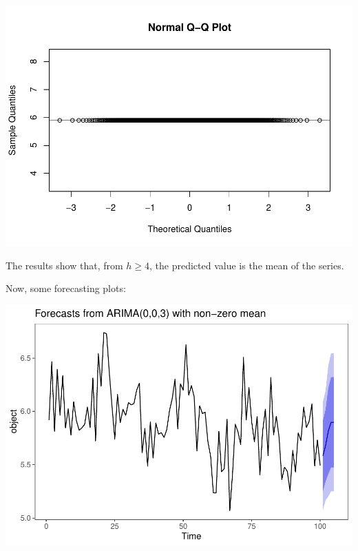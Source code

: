 \documentclass[]{article}
\newenvironment{Shaded}{\begin{snugshade}}{\end{snugshade}}
\newcommand{\DataTypeTok}[1]{\textcolor[rgb]{0.13,0.29,0.53}{#1}}
\newcommand{\KeywordTok}[1]{\textcolor[rgb]{0.13,0.29,0.53}{\textbf{#1}}}
\newcommand{\NormalTok}[1]{#1}
\newcommand{\OperatorTok}[1]{\textcolor[rgb]{0.81,0.36,0.00}{\textbf{#1}}}
\newcommand{\StringTok}[1]{\textcolor[rgb]{0.31,0.60,0.02}{#1}}
\begin{document}
\includegraphics{Econo2_P4_files/figure-latex/mean ic-10.pdf}

The results show that, from \(h \geq 4\), the predicted value is the
mean of the series.

Now, some forecasting plots:

\begin{Shaded}
\end{Shaded}

\includegraphics{Econo2_P4_files/figure-latex/forecast arima plots-1.pdf}
\end{document}
